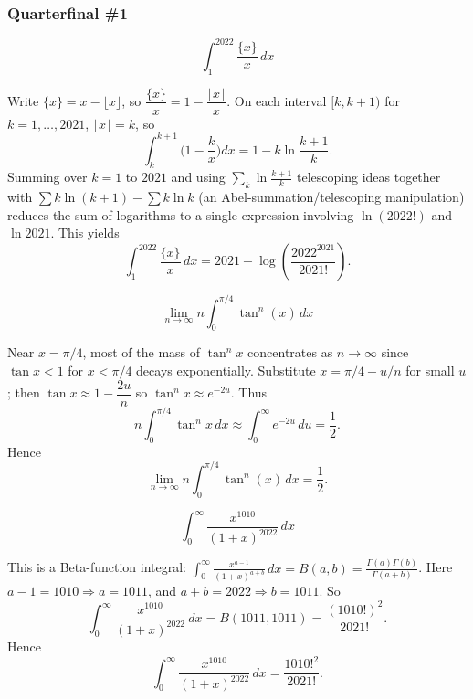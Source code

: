 \subsubsection*{Quarterfinal \#1}
\begin{questions}

\question \[\int_1^{2022} \frac{\{x\}}{x}\, dx\]
\begin{solution}
Write $\{x\}=x-\lfloor x\rfloor$, so $\dfrac{\{x\}}{x}=1-\dfrac{\lfloor x\rfloor}{x}$. On each interval $[k,k+1)$ for $k=1,\dots,2021$, $\lfloor x\rfloor=k$, so
\[
\int_k^{k+1}\Big(1-\frac{k}{x}\Big)dx = 1 - k\ln\frac{k+1}{k}.
\]
Summing over $k=1$ to $2021$ and using $\sum_k \ln\frac{k+1}{k}$ telescoping ideas together with $\sum k\ln(k+1)-\sum k\ln k$ (an Abel-summation/telescoping manipulation) reduces the sum of logarithms to a single expression involving $\ln(2022!)$ and $\ln 2021$. This yields
\[
\int_1^{2022} \frac{\{x\}}{x}\, dx = 2021-\log\!\left(\frac{2022^{2021}}{2021!}\right).
\]
\end{solution}

\question \[\lim_{n\to\infty} n\int_0^{\pi/4}\tan^n(x)\, dx\]
\begin{solution}
Near $x=\pi/4$, most of the mass of $\tan^n x$ concentrates as $n\to\infty$ since $\tan x<1$ for $x<\pi/4$ decays exponentially. Substitute $x=\pi/4-u/n$ for small $u$; then $\tan x\approx 1-\dfrac{2u}{n}$ so $\tan^n x\approx e^{-2u}$. Thus
\[
n\int_0^{\pi/4}\tan^n x\,dx \approx \int_0^\infty e^{-2u}\,du=\frac12.
\]
Hence
\[
\lim_{n\to\infty} n\int_0^{\pi/4}\tan^n(x)\, dx = \frac12.
\]
\end{solution}

\question \[\int_0^{\infty} \frac{x^{1010}}{(1+x)^{2022}}\, dx\]
\begin{solution}
This is a Beta-function integral: $\displaystyle\int_0^\infty \frac{x^{a-1}}{(1+x)^{a+b}}\,dx=B(a,b)=\frac{\Gamma(a)\Gamma(b)}{\Gamma(a+b)}$. Here $a-1=1010\Rightarrow a=1011$, and $a+b=2022\Rightarrow b=1011$. So
\[
\int_0^\infty \frac{x^{1010}}{(1+x)^{2022}}\,dx = B(1011,1011)=\frac{(1010!)^2}{2021!}.
\]
Hence
\[
\int_0^{\infty} \frac{x^{1010}}{(1+x)^{2022}}\, dx = \frac{1010!^2}{2021!}.
\]
\end{solution}

\end{questions}

